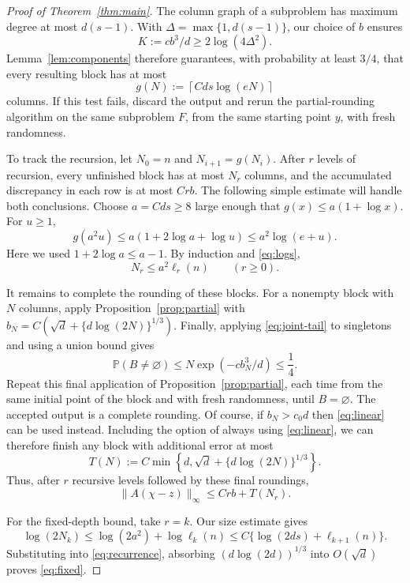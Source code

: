\documentclass[reqno]{amsart}
\theoremstyle{definition}
\newcommand{\Prob}{\mathbb P}
\newcommand{\norm}[1]{\lVert#1\rVert}
\begin{document}
\begin{proof}[Proof of Theorem~\ref{thm:main}]
The column graph of a subproblem has maximum degree at most $d(s-1)$. With $\Delta=\max\{1,d(s-1)\}$, our choice of $b$ ensures
\[ K:=cb^3/d\ge2\log(4\Delta^2). \]
Lemma~\ref{lem:components} therefore guarantees, with probability at least $3/4$, that every resulting block has at most
\begin{equation}\label{eq:g} g(N):=\left\lceil Cds\log(eN)\right\rceil \end{equation}
columns. If this test fails, discard the output and rerun the partial-rounding algorithm on the same subproblem $F$, from the same starting point $y$, with fresh randomness.

To track the recursion, let $N_0=n$ and $N_{i+1}=g(N_i)$. After $r$ levels of recursion, every unfinished block has at most $N_r$ columns, and the accumulated discrepancy in each row is at most $Crb$. The following simple estimate will handle both conclusions. Choose $a=Cds\ge8$ large enough that $g(x)\le a(1+\log x)$. For $u\ge1$,
\[ g(a^2u) \le a(1+2\log a+\log u) \le a^2\log(e+u). \]
Here we used $1+2\log a\le a-1$. By induction and \eqref{eq:logs},
\[ N_r\le a^2\ell_r(n)\qquad(r\ge0). \]

It remains to complete the rounding of these blocks. For a nonempty block with $N$ columns, apply Proposition~\ref{prop:partial} with $b_N=C(\sqrt d+\{d\log(2N)\}^{1/3})$. Finally, applying \eqref{eq:joint-tail} to singletons and using a union bound gives
\[ \Prob(B\ne\varnothing) \le N\exp(-cb_N^3/d)\le\frac14. \]
Repeat this final application of Proposition~\ref{prop:partial}, each time from the same initial point of the block and with fresh randomness, until $B=\varnothing$. The accepted output is a complete rounding. Of course, if $b_N>c_0d$ then \eqref{eq:linear} can be used instead. Including the option of always using \eqref{eq:linear}, we can therefore finish any block with additional error at most
\begin{equation}\label{eq:terminal} T(N):=C\min\left\{d,\sqrt d+\{d\log(2N)\}^{1/3}\right\}. \end{equation}
Thus, after $r$ recursive levels followed by these final roundings,
\begin{equation}\label{eq:recurrence} \norm{A(\chi-z)}_\infty \le Crb+T(N_r). \end{equation}

For the fixed-depth bound, take $r=k$. Our size estimate gives
\[ \log(2N_k) \le\log(2a^2)+\log\ell_k(n) \le C\{\log(2ds)+\ell_{k+1}(n)\}. \]
Substituting into \eqref{eq:recurrence}, absorbing $(d\log(2d))^{1/3}$ into $O(\sqrt d)$ proves \eqref{eq:fixed}.


\end{proof}
\end{document}
